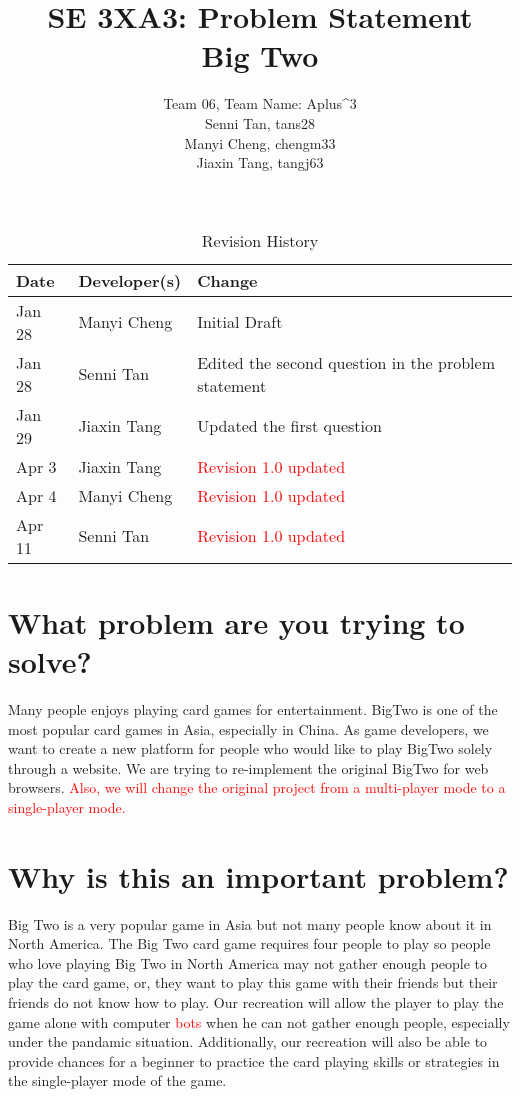 \documentclass{article}
\title{SE 3XA3: Problem Statement\\Big Two}
\author{Team 06, Team Name: Aplus^3
		\\ Senni Tan, tans28
		\\ Manyi Cheng, chengm33
		\\ Jiaxin Tang, tangj63
}
\date{}
\begin{document}
\begin{table}[h!]
\caption{Revision History} \label{TblRevisionHistory}
\begin{tabularx}{\textwidth}{llX}
\toprule
\textbf{Date} & \textbf{Developer(s)} & \textbf{Change}\\
\midrule
Jan 28 & Manyi Cheng & Initial Draft\\
Jan 28 & Senni Tan & Edited the second question in the problem statement\\
Jan 29 & Jiaxin Tang & Updated the first question\\
Apr 3 & Jiaxin Tang & \textcolor{red}{Revision 1.0 updated}\\
Apr 4 & Manyi Cheng & \textcolor{red}{Revision 1.0 updated}\\
Apr 11 & Senni Tan & \textcolor{red}{Revision 1.0 updated}\\
\bottomrule
\end{tabularx}
\end{table}

\newpage

\maketitle

\section{What problem are you trying to solve?
}
Many people enjoys playing card games for entertainment. BigTwo is one of the most popular card games in Asia, especially in China. As game developers, we want to create a new platform for people who would like to play BigTwo solely through a website. We are trying to re-implement the original BigTwo for web browsers. \textcolor{red}{Also, we will change the original project from a multi-player mode to a single-player mode.}

\section{Why is this an important problem?}
Big Two is a very popular game in Asia but not many people know about it in North America. The Big Two card game requires four people to play so people who love playing Big Two in North America may not gather enough people to play the card game, or, they want to play this game with their friends but their friends do not know how to play. Our recreation will allow the player to play the game alone with computer \textcolor{red}{bots} when he can not gather enough people, especially under the pandamic situation. Additionally, our recreation will also be able to provide chances for a beginner to practice the card playing skills or strategies in the single-player mode of the game.
\end{document}
